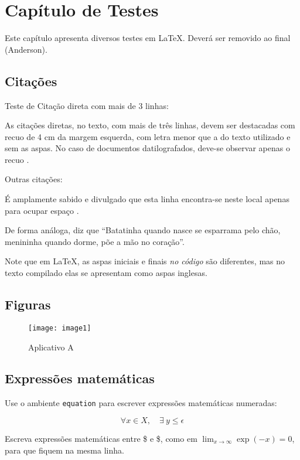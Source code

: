 \chapter{Capítulo de Testes}\label{cap4}

Este capítulo apresenta diversos testes em \LaTeX.
Deverá ser removido ao final (Anderson).

\section{Citações}

Teste de Citação direta com mais de 3 linhas:

\begin{citacao}
As citações diretas, no texto, com mais de três linhas, devem ser
destacadas com recuo de 4 cm da margem esquerda, com letra menor que a do texto
utilizado e sem as aspas. No caso de documentos datilografados, deve-se
observar apenas o recuo \cite[5.3]{NBR10520:2002}.
\end{citacao}


Outras citações:

É amplamente sabido e divulgado que esta linha encontra-se neste local apenas para ocupar espaço \cite{van86}.

De forma análoga,  diz que ``Batatinha quando nasce se esparrama pelo chão, menininha quando dorme, põe a mão no coração''. 

Note que em \LaTeX, as aspas iniciais e finais \emph{no código} são diferentes, mas no texto compilado elas se apresentam como aspas inglesas.



\section{Figuras}


\begin{figure}[h]
	\caption{\label{fig_app}Aplicativo A}
	\begin{center}
	    \texttt{[image: image1]}
	\end{center}
\end{figure}



\section{Expressões matemáticas}

Use o ambiente \texttt{equation} para escrever
expressões matemáticas numeradas:

\begin{equation}
  \forall x \in X, \quad \exists \: y \leq \epsilon
\end{equation}

Escreva expressões matemáticas entre \$ e \$, como em $ \lim_{x \to \infty}
\exp(-x) = 0 $, para que fiquem na mesma linha.

